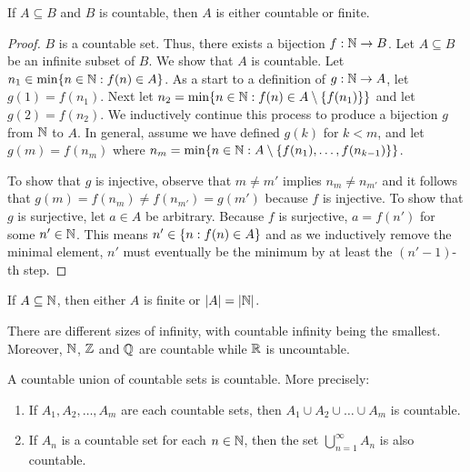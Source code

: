 \documentclass[11pt,twoside=off,numbers=noenddot]{scrbook}
\begin{document}
\begin{theorem}
  If $A \subseteq B$ and $B$ is countable, then $A$ is either
  countable or finite.
\end{theorem}

\begin{proof}
  $B$ is a countable set. Thus, there exists a bijection $f : \mathbb N \to
  B$. Let $A \subseteq B$ be an infinite subset of $B$. We show that
  $A$ is countable. Let $n_1 \in \min\{ n \in \mathbb N : f(n) \in A \}$.
  As a start to a definition of $g : \mathbb N \to A$, let $g(1) = f(n_1)$.
  Next let $n_2 = \min\{ n \in \mathbb N : f(n) \in A \setminus
  \{ f(n_1) \} \}$ and let $g(2) = f(n_2)$. We inductively continue
  this process to produce a bijection $g$ from $\mathbb N$ to $A$. In
  general, assume we have defined $g(k)$ for $k < m$, and let $g(m) =
  f(n_m)$ where $n_m = \min\{ n \in \mathbb N : A \setminus \{ f(n_1),
  \dots, f(n_{k - 1}) \} \}$.

  To show that $g$ is injective, observe that $m \neq m'$ implies
  $n_m \neq n_{m'}$ and it follows that $g(m) = f(n_m) \neq f(n_{m'})
  = g(m')$ because $f$ is injective. To show that $g$ is surjective,
  let $a \in A$ be arbitrary. Because $f$ is surjective, $a = f(n')$
  for some $n' \in \mathbb N$. This means $n' \in \{ n : f(n) \in A \}$ and
  as we inductively remove the minimal element, $n'$ must eventually
  be the minimum by at least the $(n' -1)$-th step.
\end{proof}

\begin{corollary}
  If $A \subseteq \mathbb N$, then either $A$ is finite or $| A | = | \mathbb N |$.
\end{corollary}

\begin{corollary}
  There are different sizes of infinity, with countable infinity
  being the smallest. Moreover, $\mathbb N$, $\mathbb Z$ and $\mathbb Q$ are countable
  while $\mathbb R$ is uncountable.
\end{corollary}

\begin{theorem}
  A countable union of countable sets is countable. More precisely:
  \begin{enumerate}
    \item If $A_1, A_2, \dots, A_m$ are each countable sets, then
      $A_1 \cup A_2 \cup \dots \cup A_m$ is countable.
    \item If $A_n$ is a countable set for each $n \in \mathbb N$, then the
      set $\bigcup_{n = 1}^{\infty} A_n$ is also countable.
  \end{enumerate}
\end{theorem}
\end{document}
